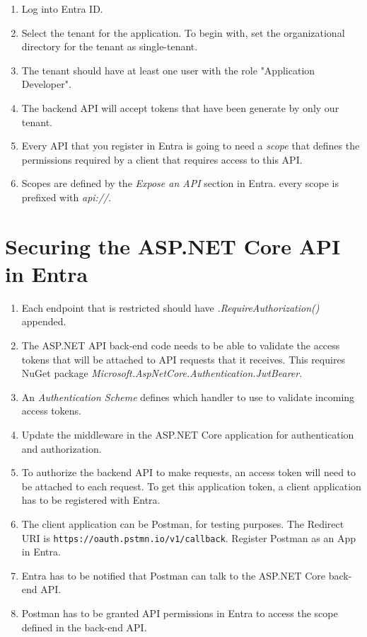 \documentclass[12pt]{report}
\begin{document}
\begin{flushleft}
\begin{enumerate}
\item Log into Entra ID.
\item Select the tenant for the application. To begin with, set the organizational directory for the tenant as single-tenant. 
\item The tenant should have at least one user with the role "Application Developer".
\item The backend API will accept tokens that have been generate by only our tenant.
\item Every API that you register in Entra is going to need a \emph{scope} that defines the permissions required by a client that requires access to this API.
\item Scopes are defined by the \emph{Expose an API} section in Entra. every scope is prefixed with \emph{api://}.

\end{enumerate}

\section{Securing the ASP.NET Core API in Entra}

\begin{enumerate}
\item Each endpoint that is restricted should have \emph{.RequireAuthorization()} appended.
\item The ASP.NET API back-end code needs to be able to validate the access tokens that will be attached to API requests that it receives. 
\newline 
This requires NuGet package \emph{Microsoft.AspNetCore.Authentication.JwtBearer}.
\item An \emph{Authentication Scheme} defines which handler to use to validate incoming access tokens.
\item Update the middleware in the ASP.NET Core application for authentication and authorization. 
\item To authorize the backend API to make requests, an access token will need to be attached to each request. To get this application token, a client application has to be registered with Entra.
\item The client application can be Postman, for testing purposes. The Redirect URI is \verb|https://oauth.pstmn.io/v1/callback|.
\newline
Register Postman as an App in Entra.
\item Entra has to be notified that Postman can talk to the ASP.NET Core back-end API.
\item Postman has to be granted API permissions in Entra to access the scope defined in the back-end API.
\end{enumerate}


\end{flushleft}
\end{document}
